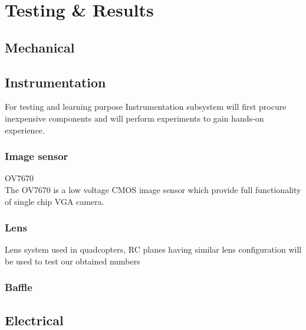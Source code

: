 \chapter{Testing \& Results}
\thispagestyle{fancy}


\section{Mechanical}
\blindtext

\section{Instrumentation}
For testing and learning purpose Instrumentation subsystem will first procure inexpensive components and will perform experiments to gain hands-on experience.
\subsection{Image sensor}
    OV7670
    \\The OV7670 is a low voltage CMOS image sensor which provide full functionality of single chip VGA camera.
\subsection{Lens}
    Lens system used in quadcopters, RC planes having similar lens configuration will be used to test our obtained numbers
\subsection{Baffle}
    



\section{Electrical} \label{sec:Electrical_test}
\blindtext
